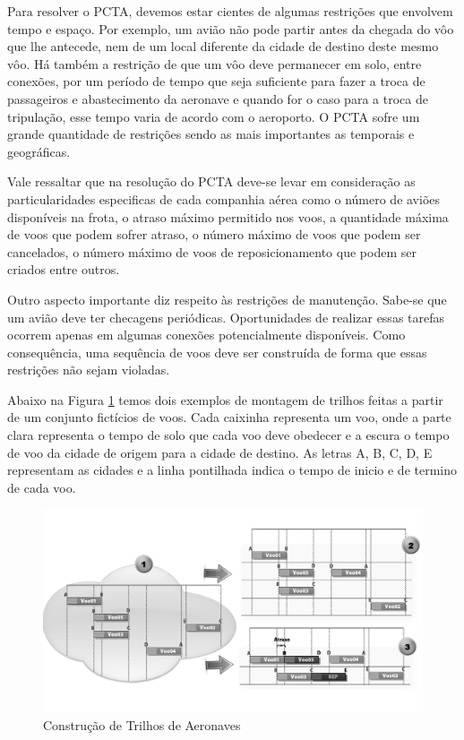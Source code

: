 \documentclass[12pt]{article}
\begin{document}
Para resolver o PCTA, devemos estar cientes de algumas restrições que envolvem tempo e espaço. Por exemplo, um avião não pode partir antes da chegada do vôo que lhe antecede, nem de um local diferente da cidade de destino deste mesmo vôo. Há também a restrição de que um vôo deve permanecer em solo, entre conexões, por um período de tempo que seja suficiente para fazer a troca de passageiros e abastecimento da aeronave e quando for o caso para a troca de tripulação, esse tempo varia de acordo com o aeroporto. O PCTA sofre um grande quantidade de restrições sendo as mais importantes as temporais e geográficas.

Vale ressaltar que na resolução do PCTA deve-se levar em consideração as particularidades especificas de cada companhia aérea como o número de aviões disponíveis na frota, o atraso máximo permitido nos voos, a quantidade máxima de voos que podem sofrer atraso, o número máximo de voos que podem ser cancelados, o número máximo de voos de reposicionamento que podem ser criados entre outros.

Outro aspecto importante diz respeito às restrições de manutenção. Sabe-se que um avião deve ter checagens periódicas. Oportunidades de realizar essas tarefas ocorrem apenas em algumas conexões potencialmente disponíveis. Como consequência, uma sequência de voos deve ser construída de forma que essas restrições não sejam violadas. 

Abaixo na Figura \ref{fig:arpexample} temos dois exemplos de montagem de trilhos feitas a partir de um conjunto fictícios de voos. Cada caixinha representa um voo, onde a parte clara representa o tempo de solo que cada voo deve obedecer e a escura o tempo de voo da cidade de origem para a cidade de destino. As letras A, B, C, D, E representam as cidades e a linha pontilhada indica o tempo de inicio e de termino de cada voo.

\begin{figure}[ht]
\centering
\includegraphics[width=.8\textwidth]{montagemtrilhopeb.png}
\caption{Construção de Trilhos de Aeronaves}
\label{fig:arpexample}
\end{figure}
\end{document}
